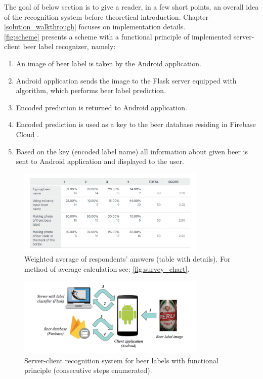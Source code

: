 \documentclass[11pt]{article}
\begin{document}
The goal of below section is to give a reader, in a few short points, an overall idea of the recognition system before theoretical introduction. Chapter \ref{solution_walkthrough} focuses on implementation details.\\

\autoref{fig:scheme} presents a scheme with a functional principle of implemented server-client beer label recognizer, namely:
\begin{enumerate}
\item An image of beer label is taken by the Android \cite{android_guide} application. 
\item Android application sends the image to the Flask \cite{flask_docs} server equipped with algorithm, which performs beer label prediction.
\item Encoded prediction is returned to Android application.
\item Encoded prediction is used as a key to the beer database residing in Firebase Cloud \cite{firebase_database_docs}.
\item Based on the key (encoded label name) all information about given beer is sent to Android application and displayed to the user.
\end{enumerate}

\begin{figure}[h]
\includegraphics[width=0.8\textwidth]{survey_table}
\centering
\caption{Weighted average of respondents' answers (table with details). For method of average calculation see: \autoref{fig:survey_chart}.}
\label{fig:survey_table}
\end{figure}

\begin{figure}[h]
\includegraphics[width=0.8\textwidth]{scheme}
\centering
\caption{Server-client recognition system for beer labels with functional principle (consecutive steps enumerated).}
\label{fig:scheme}
\end{figure}
\clearpage
\end{document}
